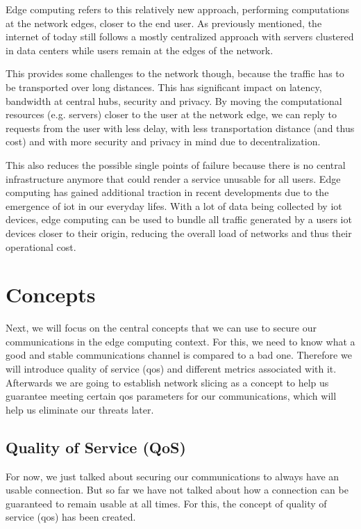 Edge computing \cite{edgecomputing} refers to this relatively new approach, performing computations at the network edges, closer to the end user. As previously mentioned, the internet of today still follows a mostly centralized approach with servers clustered in data centers while users remain at the edges of the network.

This provides some challenges to the network though, because the traffic has to be transported over long distances. This has significant impact on latency, bandwidth at central hubs, security and privacy. By moving the computational resources (e.g. servers) closer to the user at the network edge, we can reply to requests from the user with less delay, with less transportation distance (and thus cost) and with more security and privacy in mind due to decentralization.

This also reduces the possible single points of failure because there is no central infrastructure anymore that could render a service unusable for all users. Edge computing has gained additional traction in recent developments due to the emergence of \acrshort{iot} in our everyday lifes. With a lot of data being collected by \acrshort{iot} devices, edge computing can be used to bundle all traffic generated by a users \acrshort{iot} devices closer to their origin, reducing the overall load of networks and thus their operational cost.

\section{Concepts}
\label{bg_concepts}
Next, we will focus on the central concepts that we can use to secure our communications in the edge computing context. For this, we need to know what a good and stable communications channel is compared to a bad one. Therefore we will introduce quality of service (\acrshort{qos}) and different metrics associated with it. Afterwards we are going to establish network slicing as a concept to help us guarantee meeting certain \acrshort{qos} parameters for our communications, which will help us eliminate our threats later.

\subsection{Quality of Service (QoS)}
For now, we just talked about securing our communications to always have an usable connection. But so far we have not talked about how a connection can be guaranteed to remain usable at all times. For this, the concept of quality of service (\acrshort{qos}) has been created.

